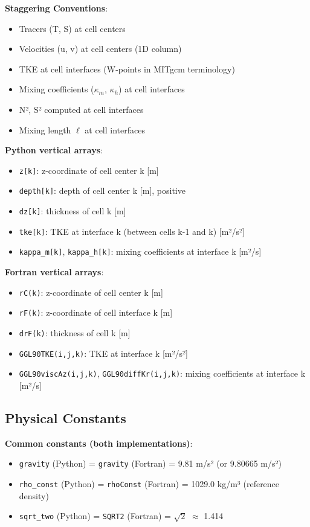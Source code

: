 \documentclass[11pt]{article}
\begin{document}
\textbf{Staggering Conventions}:
\begin{itemize}
    \item Tracers (T, S) at cell centers
    \item Velocities (u, v) at cell centers (1D column)
    \item TKE at cell interfaces (W-points in MITgcm terminology)
    \item Mixing coefficients ($\kappa_m$, $\kappa_h$) at cell interfaces
    \item N², S² computed at cell interfaces
    \item Mixing length $\ell$ at cell interfaces
\end{itemize}

\textbf{Python vertical arrays}:
\begin{itemize}
    \item \verb|z[k]|: z-coordinate of cell center k [m]
    \item \verb|depth[k]|: depth of cell center k [m], positive
    \item \verb|dz[k]|: thickness of cell k [m]
    \item \verb|tke[k]|: TKE at interface k (between cells k-1 and k) [m²/s²]
    \item \verb|kappa_m[k]|, \verb|kappa_h[k]|: mixing coefficients at interface k [m²/s]
\end{itemize}

\textbf{Fortran vertical arrays}:
\begin{itemize}
    \item \verb|rC(k)|: z-coordinate of cell center k [m]
    \item \verb|rF(k)|: z-coordinate of cell interface k [m]
    \item \verb|drF(k)|: thickness of cell k [m]
    \item \verb|GGL90TKE(i,j,k)|: TKE at interface k [m²/s²]
    \item \verb|GGL90viscAz(i,j,k)|, \verb|GGL90diffKr(i,j,k)|: mixing coefficients at interface k [m²/s]
\end{itemize}

\subsection{Physical Constants}

\textbf{Common constants (both implementations)}:
\begin{itemize}
    \item \verb|gravity| (Python) = \verb|gravity| (Fortran) = 9.81 m/s² (or 9.80665 m/s²)
    \item \verb|rho_const| (Python) = \verb|rhoConst| (Fortran) = 1029.0 kg/m³ (reference density)
    \item \verb|sqrt_two| (Python) = \verb|SQRT2| (Fortran) = $\sqrt{2}$ $\approx$ 1.414
\end{itemize}
\end{document}
